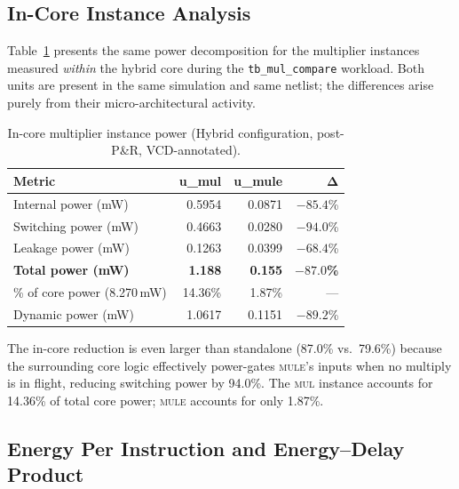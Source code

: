 \subsection{In-Core Instance Analysis}\label{sec:eval:incore}

Table~\ref{tab:incore_power} presents the same power decomposition for
the multiplier instances measured \emph{within} the hybrid core during
the \texttt{tb\_mul\_compare} workload. Both units are present in the
same simulation and same netlist; the differences arise purely from
their micro-architectural activity.

\begin{table}[t]
  \caption{In-core multiplier instance power (Hybrid configuration,
           post-P\&R, VCD-annotated).}
  \label{tab:incore_power}
  \centering
  \small
  \begin{tabular}{lrrr}
    \toprule
    \textbf{Metric} & \textbf{u\_mul} & \textbf{u\_mule} & $\boldsymbol{\Delta}$ \\
    \midrule
    Internal power (mW)  & 0.5954 & 0.0871 & $-85.4$\% \\
    Switching power (mW) & 0.4663 & 0.0280 & $-94.0$\% \\
    Leakage power (mW)   & 0.1263 & 0.0399 & $-68.4$\% \\
    \textbf{Total power (mW)} & \textbf{1.188} & \textbf{0.155} & $\boldsymbol{-87.0}$\textbf{\%} \\
    \midrule
    \% of core power (8.270\,mW) & 14.36\% & 1.87\% & --- \\
    Dynamic power (mW)   & 1.0617 & 0.1151 & $-89.2$\% \\
    \bottomrule
  \end{tabular}
\end{table}

The in-core reduction is even larger than standalone (87.0\%
vs.\ 79.6\%) because the surrounding core logic effectively power-gates
\textsc{mule}'s inputs when no multiply is in flight, reducing
switching power by 94.0\%.  The \textsc{mul} instance accounts for
14.36\% of total core power; \textsc{mule} accounts for only 1.87\%.

\subsection{Energy Per Instruction and Energy--Delay Product}%
\label{sec:eval:epi}

